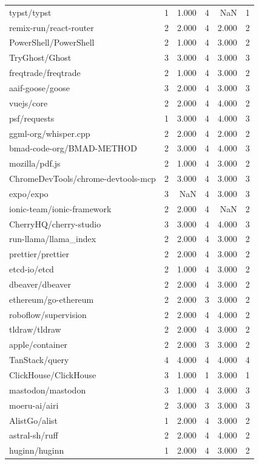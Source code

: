 \begin{tabular}{lrrrrr}
typst/typst & 1 & 1.000 & 4 & NaN & 1 \\
remix-run/react-router & 2 & 2.000 & 4 & 2.000 & 2 \\
PowerShell/PowerShell & 2 & 1.000 & 4 & 3.000 & 2 \\
TryGhost/Ghost & 3 & 3.000 & 4 & 3.000 & 3 \\
freqtrade/freqtrade & 2 & 1.000 & 4 & 3.000 & 2 \\
aaif-goose/goose & 3 & 2.000 & 4 & 3.000 & 3 \\
vuejs/core & 2 & 2.000 & 4 & 4.000 & 2 \\
psf/requests & 1 & 3.000 & 4 & 4.000 & 3 \\
ggml-org/whisper.cpp & 2 & 2.000 & 4 & 2.000 & 2 \\
bmad-code-org/BMAD-METHOD & 2 & 3.000 & 4 & 4.000 & 3 \\
mozilla/pdf.js & 2 & 1.000 & 4 & 3.000 & 2 \\
ChromeDevTools/chrome-devtools-mcp & 2 & 3.000 & 4 & 3.000 & 3 \\
expo/expo & 3 & NaN & 4 & 3.000 & 3 \\
ionic-team/ionic-framework & 2 & 2.000 & 4 & NaN & 2 \\
CherryHQ/cherry-studio & 3 & 3.000 & 4 & 4.000 & 3 \\
run-llama/llama_index & 2 & 2.000 & 4 & 3.000 & 2 \\
prettier/prettier & 2 & 2.000 & 4 & 3.000 & 2 \\
etcd-io/etcd & 2 & 1.000 & 4 & 3.000 & 2 \\
dbeaver/dbeaver & 2 & 2.000 & 4 & 3.000 & 2 \\
ethereum/go-ethereum & 2 & 2.000 & 3 & 3.000 & 2 \\
roboflow/supervision & 2 & 2.000 & 4 & 4.000 & 2 \\
tldraw/tldraw & 2 & 2.000 & 4 & 3.000 & 2 \\
apple/container & 2 & 2.000 & 3 & 3.000 & 2 \\
TanStack/query & 4 & 4.000 & 4 & 4.000 & 4 \\
ClickHouse/ClickHouse & 3 & 1.000 & 1 & 3.000 & 1 \\
mastodon/mastodon & 3 & 1.000 & 4 & 3.000 & 3 \\
moeru-ai/airi & 2 & 3.000 & 3 & 3.000 & 3 \\
AlistGo/alist & 1 & 2.000 & 4 & 3.000 & 2 \\
astral-sh/ruff & 2 & 2.000 & 4 & 4.000 & 2 \\
huginn/huginn & 1 & 2.000 & 4 & 3.000 & 2 \\

\end{tabular}
